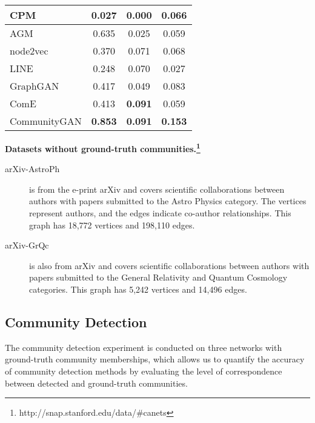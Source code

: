\documentclass[sigconf]{acmart}
\newcommand{\ComGAN}{CommunityGAN}
\begin{document}
\begin{table}[tbp]
\begin{tabular}{cccc}
\multicolumn{1}{|l|}{CPM}            & \multicolumn{1}{c|}{0.027}           & \multicolumn{1}{c|}{0.000}           & \multicolumn{1}{c|}{0.066}           \\ \hline
\multicolumn{1}{|l|}{AGM}           & \multicolumn{1}{c|}{0.635}           & \multicolumn{1}{c|}{0.025}           & \multicolumn{1}{c|}{0.059}           \\ \hline
\multicolumn{1}{|l|}{node2vec}       & \multicolumn{1}{c|}{0.370}           & \multicolumn{1}{c|}{0.071}           & \multicolumn{1}{c|}{0.068}           \\ \hline
\multicolumn{1}{|l|}{LINE}           & \multicolumn{1}{c|}{0.248}           & \multicolumn{1}{c|}{0.070}           & \multicolumn{1}{c|}{0.027}           \\ \hline
\multicolumn{1}{|l|}{GraphGAN}       & \multicolumn{1}{c|}{0.417}           & \multicolumn{1}{c|}{0.049}           & \multicolumn{1}{c|}{0.083}           \\ \hline
\multicolumn{1}{|l|}{ComE}           & \multicolumn{1}{c|}{0.413}           & \multicolumn{1}{c|}{\textbf{0.091}}  & \multicolumn{1}{c|}{0.059}           \\ \hline
\multicolumn{1}{|l|}{\ComGAN}        & \multicolumn{1}{c|}{\textbf{0.853}}  & \multicolumn{1}{c|}{\textbf{0.091}}  & \multicolumn{1}{c|}{\textbf{0.153}}  \\ \hline
\end{tabular}
\end{table}

\vspace{5pt}\noindent\textbf{Datasets without ground-truth communities.\footnote{http://snap.stanford.edu/data/\#canets}}
\begin{description}
  \item[arXiv-AstroPh] is from the e-print arXiv and covers scientific collaborations between authors with papers submitted to the Astro Physics category.
  The vertices represent authors, and the edges indicate co-author relationships.
  This graph has 18,772 vertices and 198,110 edges.
  \item[arXiv-GrQc] is also from arXiv and covers scientific collaborations between authors with papers submitted to the General Relativity and Quantum Cosmology categories.
  This graph has 5,242 vertices and 14,496 edges.
\end{description}

\subsection{Community Detection}
The community detection experiment is conducted on three networks with ground-truth community memberships, which allows us to quantify the accuracy of community detection methods by evaluating the level of correspondence between detected and ground-truth communities.
\end{document}
